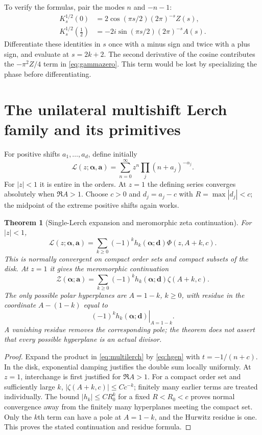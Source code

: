 \documentclass[11pt,a4paper]{article}
\numberwithin{equation}{section}
\newtheorem{theorem}{Theorem}[section]
\theoremstyle{definition}\newtheorem{definition}[theorem]{Definition}
\theoremstyle{remark}\newtheorem{remark}[theorem]{Remark}
\newcommand{\av}{\boldsymbol\alpha}\newcommand{\dv}{\boldsymbol d}
\begin{document}
To verify the formulas, pair the modes $n$ and $-n-1$:
\begin{align*}
 K_s^{1/2}(0)&=2\cos(\pi s/2)(2\pi)^{-s}Z(s),\\
 K_s^{1/2}(\tfrac12)&=-2i\sin(\pi s/2)(2\pi)^{-s}A(s).
\end{align*}
Differentiate these identities in $s$ once with a minus sign and twice
with a plus sign, and evaluate at $s=2k+2$. The second derivative of
the cosine contributes the $-\pi^2Z/4$ term in \eqref{eq:gammazero}.
This term would be lost by specializing the phase before differentiating.

\section{The unilateral multishift Lerch family and its primitives}
\label{sec:unilateral}
For positive shifts $a_1,\ldots,a_d$, define initially
\begin{equation}
 \mathcal L(z;\av,\boldsymbol a)
   =\sum_{n=0}^\infty z^n\prod_j(n+a_j)^{-\alpha_j}.
 \label{eq:multilerch}
\end{equation}
For $|z|<1$ it is entire in the orders. At $z=1$ the defining series
converges absolutely when $\Re A>1$.
Choose $c>0$ and $d_j=a_j-c$ with $R=\max|d_j|<c$; the midpoint of
the extreme positive shifts again works.

\begin{theorem}[Single-Lerch expansion and meromorphic zeta continuation]
\label{thm:multizeta}
For $|z|<1$,
\begin{equation}
 \mathcal L(z;\av,\boldsymbol a)
    =\sum_{k\ge0}(-1)^kh_k(\av;\dv)\Phi(z,A+k,c).
 \label{eq:unilateral}
\end{equation}
This is normally convergent on compact order sets and compact subsets
of the disk. At $z=1$ it gives the meromorphic continuation
\begin{equation}
 \mathcal Z(\av;\boldsymbol a)
    =\sum_{k\ge0}(-1)^kh_k(\av;\dv)\zeta(A+k,c).
 \label{eq:multizeta}
\end{equation}
The only possible polar hyperplanes are $A=1-k$, $k\ge0$, with
residue in the coordinate $A-(1-k)$ equal to
\begin{equation}
 \left.(-1)^kh_k(\av;\dv)\right|_{A=1-k}.
 \label{eq:residues}
\end{equation}
A vanishing residue removes the corresponding pole; the theorem does
not assert that every possible hyperplane is an actual divisor.
\end{theorem}
\begin{proof}
Expand the product in \eqref{eq:multilerch} by
\eqref{eq:hgen} with $t=-1/(n+c)$. In the disk, exponential damping
justifies the double sum locally uniformly. At $z=1$, interchange is
first justified for $\Re A>1$. For a compact order set and sufficiently
large $k$, $|\zeta(A+k,c)|\le Cc^{-k}$; finitely many earlier terms
are treated individually. The bound $|h_k|\le CR_0^k$ for a fixed
$R<R_0<c$ proves normal convergence away from the finitely many
hyperplanes meeting the compact set. Only the $k$th term can have a
pole at $A=1-k$, and the Hurwitz residue is one. This proves the stated
continuation and residue formula.
\end{proof}
\end{document}
